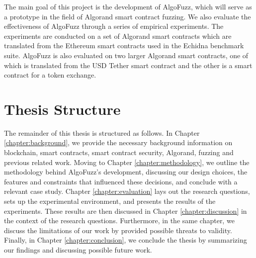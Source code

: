 The main goal of this project is the development of AlgoFuzz, which will serve as a prototype in the field of Algorand smart contract fuzzing.
We also evaluate the effectiveness of AlgoFuzz through a series of empirical experiments.
The experiments are conducted on a set of Algorand smart contracts which are translated from the Ethereum smart contracts used in the Echidna benchmark suite.
AlgoFuzz is also evaluated on two larger Algorand smart contracts, one of which is translated from the USD Tether \cite{etherscanio_tether_nodate} smart contract and the other is a smart contract for a token exchange.

\section*{Thesis Structure}
The remainder of this thesis is structured as follows.
In Chapter \ref{chapter:background}, we provide the necessary background information on blockchain, smart contracts, smart contract security, Algorand, fuzzing and previous related work.
Moving to Chapter \ref{chapter:methodology}, we outline the methodology behind AlgoFuzz's development, discussing our design choices, the features and constraints that influenced these decisions, and conclude with a relevant case study.
Chapter \ref{chapter:evaluation} lays out the research questions, sets up the experimental environment, and presents the results of the experiments.
These results are then discussed in Chapter \ref{chapter:discussion} in the context of the research questions. Furthermore, in the same chapter, we discuss the limitations of our work by provided possible threats to validity.
Finally, in Chapter \ref{chapter:conclusion}, we conclude the thesis by summarizing our findings and discussing possible future work.



